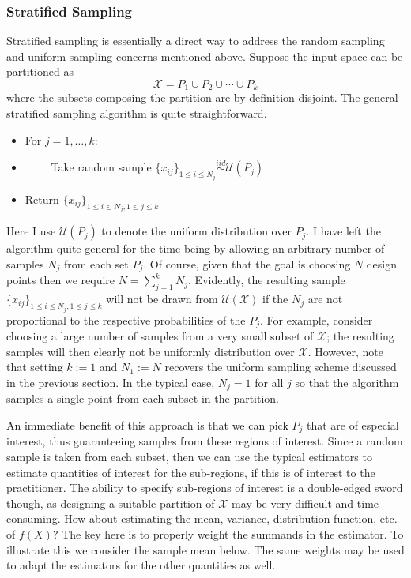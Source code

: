 \documentclass[12pt]{article}
\begin{document}
\subsubsection{Stratified Sampling}
Stratified sampling is essentially a direct way to address the random sampling and uniform sampling concerns mentioned above. Suppose the input space can be 
partitioned as 
\[\mathcal{X} = P_1 \cup P_2 \cup \cdots \cup P_k\]
where the subsets composing the partition are by definition disjoint. The general stratified sampling algorithm is quite straightforward. 
\begin{itemize}
\item For $j = 1, \dots, k$: 
\item $\qquad$ Take random sample $\{x_{ij}\}_{1 \leq i \leq N_j} \overset{iid}{\sim} \mathcal{U}(P_j)$
\item Return $\{x_{ij}\}_{1 \leq i \leq N_j, 1 \leq j \leq k}$
\end{itemize}
Here I use $\mathcal{U}(P_j)$ to denote the uniform distribution over $P_j$. I have left the algorithm quite general for the time being by allowing an 
arbitrary number of samples $N_j$ from each set $P_j$. Of course, given that the goal is choosing $N$ design points then we require 
$N = \sum_{j = 1}^{k} N_j$. Evidently, the resulting sample $\{x_{ij}\}_{1 \leq i \leq N_j, 1 \leq j \leq k}$ will not be drawn from $\mathcal{U}(\mathcal{X})$
if the $N_j$ are not proportional to the respective probabilities of the $P_j$. For example, consider choosing a large number of samples from a very small
subset of $\mathcal{X}$; the resulting samples will then clearly not be uniformly distribution over $\mathcal{X}$. However, note that setting $k := 1$
and $N_1 := N$ recovers the uniform sampling scheme discussed in the previous section. In the typical case, $N_j = 1$ for all $j$ so that the algorithm samples
a single point from each subset in the partition. 

An immediate benefit of this approach is that we can pick $P_j$ that are of especial interest, thus guaranteeing samples from these regions of interest. 
Since a random sample is taken from each subset, then we can use the typical estimators to estimate quantities of interest for the sub-regions, if this 
is of interest to the practitioner. 
The ability to specify sub-regions of interest is a double-edged sword though, as designing a suitable partition of $\mathcal{X}$ may be very difficult and time-consuming. 
How about estimating the mean, variance, distribution function, etc. of $f(X)$? The key here is to properly weight the summands in the estimator. To illustrate this we consider
the sample mean below. The same weights may be used to adapt the estimators for the other quantities as well. 
\end{document}
